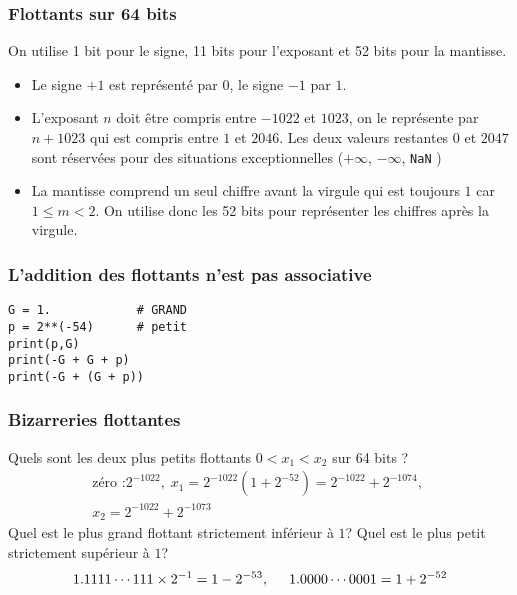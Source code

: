 \begin{frame}
\frametitle{Flottants sur 64 bits}
On utilise 1 bit pour le signe, 11 bits pour l'exposant et 52 bits pour la mantisse.
\begin{itemize}
 \item Le signe $+1$ est représenté par $0$, le signe $-1$ par $1$.
 \item L'exposant $n$ doit être compris entre $-1022$ et $1023$, on le représente par $n + 1023$ qui est compris entre $1$ et $2046$. Les deux valeurs restantes $0$ et $2047$ sont réservées pour des situations exceptionnelles ($+\infty$, $-\infty$, \texttt{NaN} )
 \item La mantisse comprend un seul chiffre avant la virgule qui est toujours $1$ car $1\leq m <2$. On utilise donc les 52 bits pour représenter les chiffres après la virgule. 
\end{itemize}  
\end{frame}

\begin{frame}[fragile]
  \frametitle{L'addition des flottants n'est pas associative}
\begin{verbatim}
G = 1.            # GRAND
p = 2**(-54)      # petit
print(p,G)
print(-G + G + p)
print(-G + (G + p))
\end{verbatim}


\end{frame}


\begin{frame}
  \frametitle{Bizarreries flottantes}
Quels sont les deux plus petits flottants $0<x_1<x_2$ sur 64 bits ?
\begin{multline*}
  \text{zéro :} 2^{-1022},\; x_1 = 2^{-1022}(1 + 2^{-52}) = 2^{-1022} + 2^{-1074},\;\\ x_2 = 2^{-1022} + 2^{-1073}  
\end{multline*}
Quel est le plus grand flottant strictement inférieur à $1$? Quel est le plus petit strictement supérieur à $1$?
\begin{displaymath}
  1.1111\cdots 111 \times 2^{-1} = 1 -2^{-53},\hspace{0.5cm} 1.0000 \cdots 0001 = 1+2^{-52}
\end{displaymath}

\end{frame}


